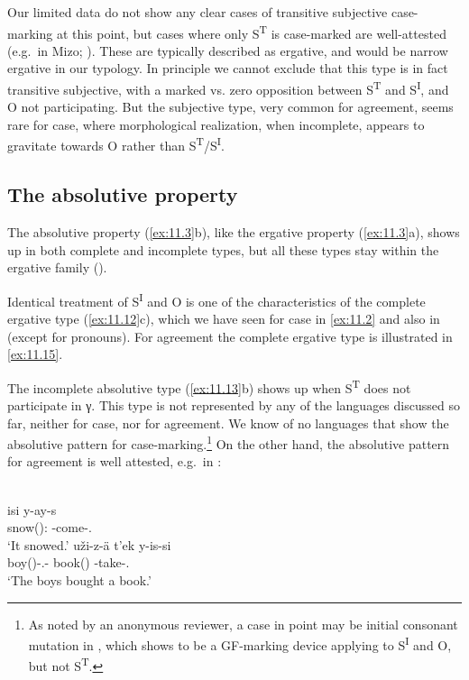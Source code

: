 \documentclass[output=paper]{langsci/langscibook}
\begin{document}
Our limited data do not show any clear cases of transitive subjective
case-marking at this point, but cases where only S\textsuperscript{T} is
case-marked are well-attested (e.g.\ in Mizo; \citealt{Chhangte1989}). These
are typically described as ergative, and would be narrow ergative in our
typology.  In principle we cannot exclude that this type is in fact transitive
subjective, with a marked vs. zero opposition between S\textsuperscript{T} and
S\textsuperscript{I}, and O not participating. But the subjective type, very
common for agreement, seems rare for case, where morphological realization,
when incomplete, appears to gravitate towards O rather than
S\textsuperscript{T}/S\textsuperscript{I}.

\subsection{The absolutive property}\label{sec:11.5.2}

The absolutive property (\ref{ex:11.3}b), like the ergative property
(\ref{ex:11.3}a), shows up in both complete and incomplete types, but all
these types stay within the ergative family ().

Identical treatment of S\textsuperscript{I} and O is one of the characteristics
of the complete ergative type (\ref{ex:11.12}c), which we have seen for
case in  \eqref{ex:11.2} and also in 
(except for pronouns). For agreement the complete ergative type is illustrated
in  \eqref{ex:11.15}.

\largerpage[2]
The incomplete absolutive type (\ref{ex:11.13}b) shows up when
S\textsuperscript{T} does not participate in γ. This type is not
represented by any of the languages discussed so far, neither for case, nor for
agreement. We know of no languages that show the absolutive pattern for
case-marking.\footnote{As noted by an anonymous reviewer, a case in point may
    be initial consonant mutation in , which
    \parencite[342--343]{Brown2001} shows to be a \gls{GF}-marking device
applying to S\textsuperscript{I} and O, but not S\textsuperscript{T}.} On the
other hand, the absolutive pattern for agreement is well attested, e.g.\ in
 \parencite[344--345]{Polinsky2014}:

\ea%
    \label{ex:11.16}  \parencite[345]{Polinsky2014}\\
	\ea
		\gll isi        y-ay-s \\
            snow(\Ii):\Abs{} \Ii-come-\Pst.\Evid{}\\
		\glt ‘It snowed.’
	\ex
		\gll uži-z-ä t’ek y-is-si\\
			boy(\Ig)-\Pl.\Obl-\Erg{}  book(\Ii)  \Ii-take-\Pst.\Evid{}\\
		\glt ‘The boys bought a book.’
	\z
\z
\end{document}
